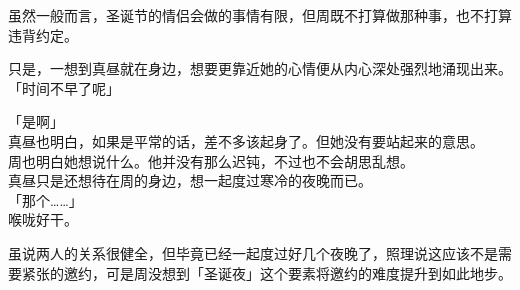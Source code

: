 虽然一般而言，圣诞节的情侣会做的事情有限，但周既不打算做那种事，也不打算违背约定。

只是，一想到真昼就在身边，想要更靠近她的心情便从内心深处强烈地涌现出来。\\

「时间不早了呢」

「是啊」\\

真昼也明白，如果是平常的话，差不多该起身了。但她没有要站起来的意思。\\

周也明白她想说什么。他并没有那么迟钝，不过也不会胡思乱想。\\

真昼只是还想待在周的身边，想一起度过寒冷的夜晚而已。\\

「那个……」\\

喉咙好干。

虽说两人的关系很健全，但毕竟已经一起度过好几个夜晚了，照理说这应该不是需要紧张的邀约，可是周没想到「圣诞夜」这个要素将邀约的难度提升到如此地步。

